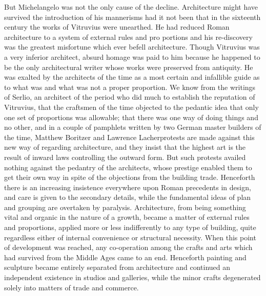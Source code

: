 \documentclass{book}
\begin{document}
But Michelangelo was not the only cause of the decline. Architecture might have survived the introduction of his mannerisms had it not been that in the sixteenth century the works of Vitruvius were unearthed. He had reduced Roman architecture to a system of external rules and pro portions and his re-discovery was the greatest misfortune which ever befell architecture. Though Vitruvius was a very inferior architect, absurd homage was paid to him because he happened to be the only architectural writer whose works were preserved from antiquity. He was exalted by the architects of the time as a most certain and infallible guide as to what was and what was not a proper proportion. We know from the writings of Serlio, an architect of the period who did much to establish the reputation of Vitruvius, that the craftsmen of the time objected to the pedantic idea that only one set of proportions was allowable; that there was one way of doing things and no other, and in a couple of pamphlets written by two German master builders of the time, Matthew Boritzer and Lawrence Lacher\footnotemark[3] protests are made against this new way of regarding architecture, and they insist that the highest art is the result of inward laws controlling the outward form. But such protests availed nothing against the pedantry of the architects, whose prestige enabled them to get their own way in spite of the objections from the building trade. Henceforth there is an increasing insistence everywhere upon Roman precedents in design, and care is given to the secondary details, while the fundamental ideas of plan and grouping are overtaken by paralysis. Architecture, from being something vital and organic in the nature of a growth, became a matter of external rules and proportions, applied more or less indifferently to any type of building, quite regardless either of internal convenience or structural necessity. When this point of development was reached, any co-operation among the crafts and arts which had survived from the Middle Ages came to an end. Henceforth painting and sculpture became entirely separated from architecture and continued an independent existence in studios and galleries, while the minor crafts degenerated solely into matters of trade and commerce.
\end{document}
